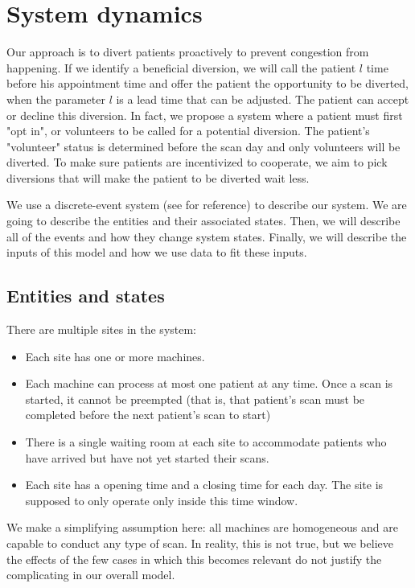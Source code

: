 \section{System dynamics}

Our approach is to divert patients proactively to prevent
congestion from happening. If we identify
a beneficial diversion, we will call the patient $l$ time
before his appointment time and offer the patient
the opportunity to be diverted, when the parameter $l$
is a lead time that can be adjusted. The patient can accept or
decline this diversion. In fact, we propose a system where
a patient must first "opt in", or volunteers to be called
for a potential diversion. The patient's "volunteer" status
is determined before the scan day and only volunteers
will be diverted. To make sure patients
are incentivized to cooperate, we aim to pick diversions
that will make the patient to be diverted wait less.

We use a discrete-event system (see \cite{kelton2000simulation}
for reference) to describe our system. We are going
to describe the entities and their associated states. Then, we
will describe all of the events and how they change system states.
Finally, we will describe the inputs of this model and how
we use data to fit these inputs.

\subsection{Entities and states}

There are multiple sites in the system:
\begin{itemize}
\item Each site has one or more machines.
\item Each machine can process at most one patient at any time.
  Once a scan is started, it cannot be preempted (that is, that
  patient's scan must be completed before the next patient's
  scan to start)
\item There is a single waiting room at each site to accommodate
      patients who have arrived but have not yet started their scans.
\item Each site has a opening time and a closing time for each day.
      The site is supposed to only operate only inside this time window.
\end{itemize}
We make a simplifying assumption here: all machines are homogeneous
and are capable to conduct any type of scan. In reality, this is not
true, but we believe the effects of the few cases in which this becomes
relevant do not justify the complicating in our overall model.

